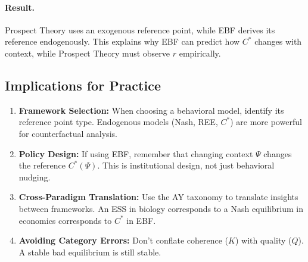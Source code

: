 \paragraph{Result.}
Prospect Theory uses an exogenous reference point, while EBF derives its
reference endogenously. This explains why EBF can predict how $C^*$ changes
with context, while Prospect Theory must observe $r$ empirically.



\subsection{Implications for Practice}
\label{sec:AY-practice}

\begin{tcolorbox}[colback=green!5!white, colframe=green!75!black,
    title=\textbf{Practical Implications}]

\begin{enumerate}
    \item \textbf{Framework Selection:} When choosing a behavioral model,
          identify its reference point type. Endogenous models (Nash, REE, $C^*$)
          are more powerful for counterfactual analysis.

    \item \textbf{Policy Design:} If using EBF, remember that changing
          context $\Psi$ changes the reference $C^*(\Psi)$. This is
          institutional design, not just behavioral nudging.

    \item \textbf{Cross-Paradigm Translation:} Use the AY taxonomy to translate
          insights between frameworks. An ESS in biology corresponds to a
          Nash equilibrium in economics corresponds to $C^*$ in EBF.

    \item \textbf{Avoiding Category Errors:} Don't conflate coherence ($K$)
          with quality ($Q$). A stable bad equilibrium is still stable.
\end{enumerate}

\end{tcolorbox}



